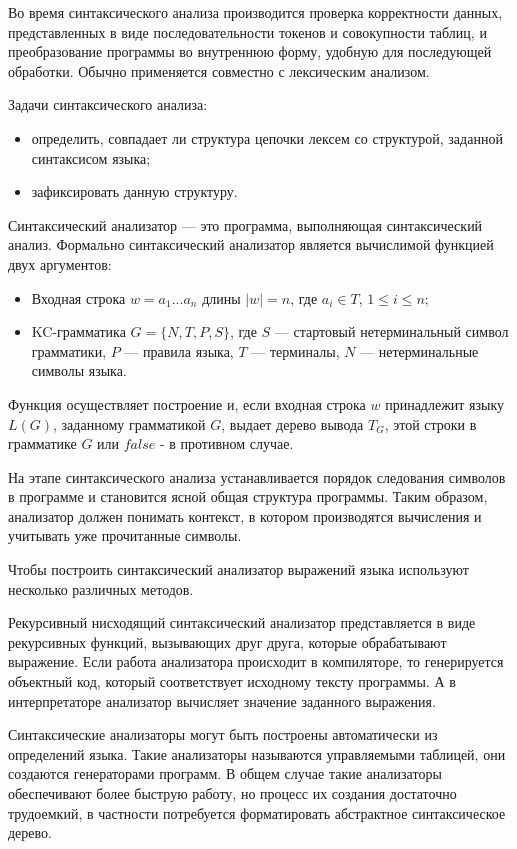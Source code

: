 \documentclass[bachelor, och, coursework, times]{SCWorks}
\begin{document}
Во время синтаксического анализа производится проверка корректности данных, представленных в виде последовательности токенов и совокупности таблиц, и преобразование программы во внутреннюю форму, удобную для последующей обработки. Обычно применяется совместно с лексическим анализом.

Задачи синтаксического анализа:
\begin{itemize}
\item определить, совпадает ли структура цепочки лексем со структурой, заданной синтаксисом языка;
\item зафиксировать данную структуру.
\end{itemize}

Синтаксический анализатор --- это программа, выполняющая синтаксический анализ.
Формально синтаксический анализатор является вычислимой функцией двух аргументов:
\begin{itemize}
\item Входная строка $w = a_1...a_n$ длины $|w| = n$, где $a_i \in T$, $1 \leqslant i \leqslant n$;
\item KC-грамматика $G = \{N, T, P, S\}$, где $S$ --- стартовый нетерминальный символ грамматики, $P$ --- правила языка, $T$ --- терминалы, $N$ --- нетерминальные символы языка.
\end{itemize}

Функция осуществляет построение и, если входная строка $w$ принадлежит языку $L(G)$, заданному грамматикой $G$, выдает дерево вывода $T_G$, этой строки в грамматике $G$ или $false$ - в противном случае.

На этапе синтаксического анализа устанавливается порядок следования символов в программе и становится ясной общая структура программы. Таким образом, анализатор должен понимать контекст, в котором производятся вычисления и учитывать уже прочитанные символы.

Чтобы построить синтаксический анализатор выражений языка используют несколько различных методов.

Рекурсивный нисходящий синтаксический анализатор представляется в виде рекурсивных функций, вызывающих друг друга, которые обрабатывают выражение. Если работа анализатора происходит в компиляторе, то генерируется объектный код, который соответствует исходному тексту программы.
А в интерпретаторе анализатор вычисляет значение заданного выражения.

Синтаксические анализаторы могут быть построены автоматически из определений языка. Такие анализаторы называются управляемыми таблицей, они создаются генераторами программ. В общем случае такие анализаторы обеспечивают более быструю работу, но процесс их создания достаточно трудоемкий, в частности потребуется форматировать абстрактное синтаксическое дерево.
\end{document}
